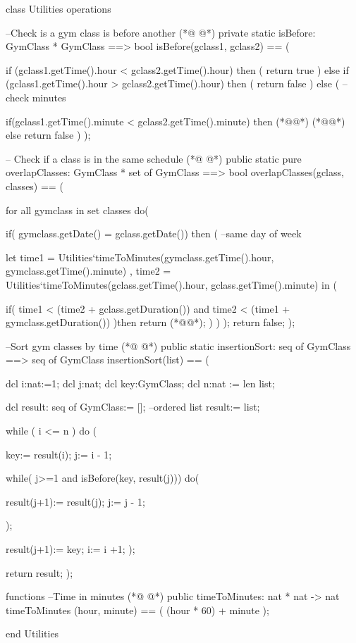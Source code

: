 \begin{vdmpp}[breaklines=true]
class Utilities
operations

--Check is a gym class is before another
(*@
\label{isBefore:5}
@*)
private static isBefore: GymClass * GymClass ==> bool
isBefore(gclass1, gclass2) == (
 
 if (gclass1.getTime().hour < gclass2.getTime().hour) then (
  return true
 )
 else if (gclass1.getTime().hour > gclass2.getTime().hour) then (
  return false
 )
 else ( --check minutes
 
  if(gclass1.getTime().minute < gclass2.getTime().minute)
     then (*@@*) (*@@*) else return false
 ) 
);

 -- Check if a class is in the same schedule  
(*@
\label{overlapClasses:22}
@*)
 public static pure overlapClasses: GymClass * set of GymClass ==> bool
 overlapClasses(gclass, classes) == (
  
  for all gymclass in set classes do(
   
   if( gymclass.getDate() = gclass.getDate()) then ( --same day of week
    
    let time1 = Utilities`timeToMinutes(gymclass.getTime().hour, gymclass.getTime().minute) ,
       time2 =  Utilities`timeToMinutes(gclass.getTime().hour, gclass.getTime().minute)  in (
      
     if( time1 < (time2 + gclass.getDuration()) and time2 < (time1 + gymclass.getDuration()) )then
       return (*@@*);
     )
   )
  );
  return false;
 );  
  
--Sort gym classes by time
(*@
\label{insertionSort:41}
@*)
public static insertionSort: seq of GymClass ==> seq of GymClass 
insertionSort(list) == (
 
 dcl i:nat:=1;
 dcl j:nat;
 dcl key:GymClass;
 dcl n:nat := len list;
 
 dcl result: seq of GymClass:= []; --ordered list
 result:= list;
 
 while ( i <= n ) do (
  
  key:= result(i);
  j:= i - 1;

  while( j>=1 and isBefore(key, result(j))) do( 
  
   result(j+1):= result(j);
   j:= j - 1;
  
  );
  
   result(j+1):= key;
  i:= i +1;
 );
 
  return result;
);

functions
--Time in minutes
(*@
\label{timeToMinutes:73}
@*)
public timeToMinutes: nat * nat -> nat
timeToMinutes (hour, minute) == (
 (hour * 60) + minute
);

end Utilities
\end{vdmpp}
